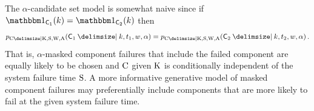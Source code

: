 \documentclass[
    11pt,
    extrafontsizes,
    article,
    oldfontcommands,
    final,
    oneside,
    openany,
    hidelinks]{memoir}
\begin{document}
\begin{remark}
The $\alpha$-candidate set model is somewhat naive since if $\SetIndicator{\cand_1}(k) = \SetIndicator{\cand_2}(k)$ then
\begin{equation}
\pmf_{\rvcand \Given \RV{K}, \sv, \RV{W}, \RV{A}}(\cand_1 \Given k, t_1, w, \alpha) = \pmf_{\rvcand \Given \RV{K}, \sv, \RV{W}, \RV{A}}(\cand_2 \Given k, t_2, w, \alpha)\,.
\end{equation}
That is, $\alpha$-masked component failures that include the failed component are equally likely to be chosen and $\mathrm{C}$ given $\mathrm{K}$ is conditionally independent of the system failure time $\mathrm{S}$.
A more informative generative model of masked component failures may preferentially include components that are more likely to fail at the given system failure time.
\end{remark}
\end{document}
